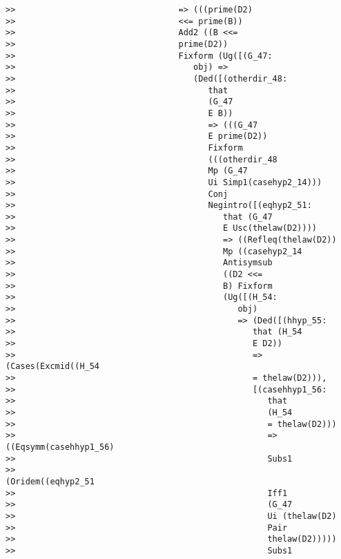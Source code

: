 \documentclass[12pt]{article}
\begin{document}
\begin{verbatim}
>>                                 => (((prime(D2)
>>                                 <<= prime(B))
>>                                 Add2 ((B <<=
>>                                 prime(D2))
>>                                 Fixform (Ug([(G_47:
>>                                    obj) =>
>>                                    (Ded([(otherdir_48:
>>                                       that
>>                                       (G_47
>>                                       E B))
>>                                       => (((G_47
>>                                       E prime(D2))
>>                                       Fixform
>>                                       (((otherdir_48
>>                                       Mp (G_47
>>                                       Ui Simp1(casehyp2_14)))
>>                                       Conj
>>                                       Negintro([(eqhyp2_51:
>>                                          that (G_47
>>                                          E Usc(thelaw(D2))))
>>                                          => ((Refleq(thelaw(D2))
>>                                          Mp ((casehyp2_14
>>                                          Antisymsub
>>                                          ((D2 <<=
>>                                          B) Fixform
>>                                          (Ug([(H_54:
>>                                             obj)
>>                                             => (Ded([(hhyp_55:
>>                                                that (H_54
>>                                                E D2))
>>                                                => (Cases(Excmid((H_54
>>                                                = thelaw(D2))),
>>                                                [(casehhyp1_56:
>>                                                   that
>>                                                   (H_54
>>                                                   = thelaw(D2)))
>>                                                   => ((Eqsymm(casehhyp1_56)
>>                                                   Subs1
>>                                                   (Oridem((eqhyp2_51
>>                                                   Iff1
>>                                                   (G_47
>>                                                   Ui (thelaw(D2)
>>                                                   Pair
>>                                                   thelaw(D2)))))
>>                                                   Subs1

\end{verbatim}
\end{document}
